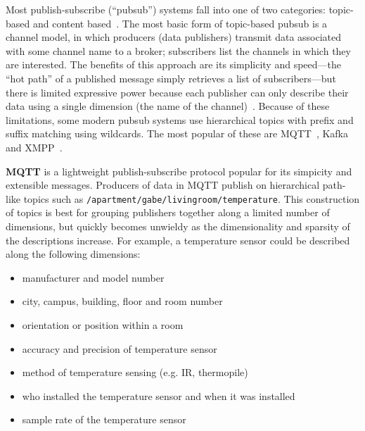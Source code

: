 Most publish-subscribe (``pubsub'') systems fall into one of two categories: topic-based and content based~\cite{eugster2003many}.
The most basic form of topic-based pubsub is a channel model, in which producers (data publishers) transmit data associated with some channel name to a broker; subscribers list the channels in which they are interested.
The benefits of this approach are its simplicity and speed---the ``hot path'' of a published message simply retrieves a list of subscribers---but there is limited expressive power because each publisher can only describe their data using a single dimension (the name of the channel)~\cite{redis}.
Because of these limitations, some modern pubsub systems use hierarchical topics with prefix and suffix matching using wildcards. The most popular of these are MQTT~\cite{locke2010mq}, Kafka~\cite{kreps2011kafka} and XMPP~\cite{saint2011extensible}.


\textbf{MQTT} is a lightweight publish-subscribe protocol popular for its simpicity and extensible messages.
Producers of data in MQTT publish on hierarchical path-like topics such as \texttt{/apartment/gabe/livingroom/temperature}.
This construction of topics is best for grouping publishers together along a limited number of dimensions, but quickly becomes unwieldy as the dimensionality and sparsity of the descriptions increase.
For example, a temperature sensor could be described along the following dimensions:

\begin{itemize}
\item manufacturer and model number
\item city, campus, building, floor and  room number
\item orientation or position within a room
\item accuracy and precision of temperature sensor
\item method of temperature sensing (e.g. IR, thermopile)
\item who installed the temperature sensor and when it was installed
\item sample rate of the temperature sensor
\end{itemize}

